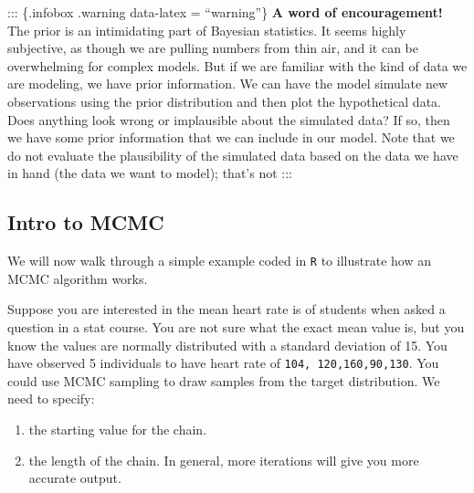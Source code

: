 \documentclass[
  12pt,
]{book}
\providecommand{\tightlist}{%
  \setlength{\itemsep}{0pt}\setlength{\parskip}{0pt}}
\begin{document}
::: \{.infobox .warning data-latex = ``warning''\}
\textbf{A word of encouragement!} The prior is an intimidating part of Bayesian
statistics. It seems highly subjective, as though we are pulling numbers from
thin air, and it can be overwhelming for complex models. But if we are familiar
with the kind of data we are modeling, we have prior information. We can have
the model simulate new observations using the prior distribution and then
plot the hypothetical data. Does anything look wrong or implausible about the
simulated data? If so, then we have some prior information that we can include
in our model. Note that we do not evaluate the plausibility of the simulated
data based on the data we have in hand (the data we want to model); that's not
:::

\hypertarget{intro-to-mcmc}{%
\subsection{Intro to MCMC}\label{intro-to-mcmc}}

We will now walk through a simple example coded in \texttt{R} to illustrate how an MCMC algorithm works.

Suppose you are interested in the mean heart rate is of students when asked a question in a stat course. You are not sure what the exact mean value is, but you know the values are normally distributed with a standard deviation of 15. You have observed 5 individuals to have heart rate of \texttt{104,\ 120,160,90,130}. You could use MCMC sampling to draw samples from the target distribution.
We need to specify:

\begin{enumerate}
\def\labelenumi{\arabic{enumi}.}
\tightlist
\item
  the starting value for the chain.
\item
  the length of the chain. In general, more iterations will give you more accurate output.
\end{enumerate}
\end{document}
